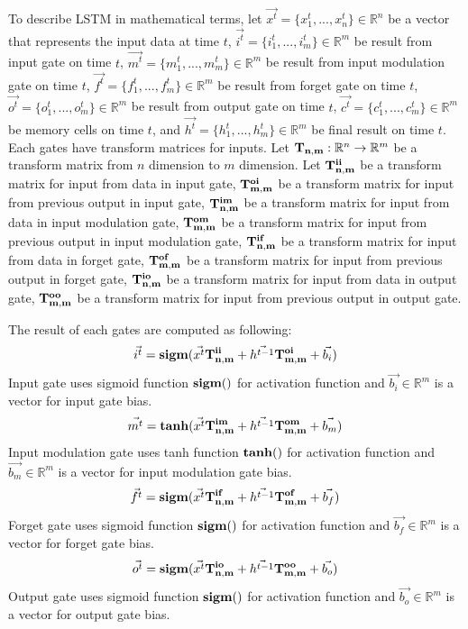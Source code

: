\documentclass[draft,dvipsnames]{drexel-thesis}
\begin{document}
\begin{thesis}
\begin{enumerate}
	To describe LSTM in mathematical terms, let $\vec{x^t} = \{ x_1^t, ..., x_n^t\} \in \mathbb{R}^n$ be a vector that represents the input data at time $t$, $\vec{i^t} = \{i_1^t, ..., i_m^t\} \in \mathbb{R}^m$ be result from input gate on time $t$, $\vec{m^t} = \{m_1^t, ..., m_m^t\} \in \mathbb{R}^m$ be result from input modulation gate on time $t$, $\vec{f^t} = \{f_1^t, ..., f_m^t\} \in \mathbb{R}^m$ be result from forget gate on time $t$, $\vec{o^t} = \{o_1^t, ..., o_m^t\} \in \mathbb{R}^m$ be result from output gate on time $t$, $\vec{c^t} = \{c_1^t, ..., c_m^t\} \in \mathbb{R}^m$ be memory cells on time $t$, and $\vec{h^t} = \{h_1^t, ..., h_m^t\} \in \mathbb{R}^m$ be final result on time $t$.
Each gates have transform matrices for inputs. Let $\bold{T_{n,m}}: \mathbb{R}^n \rightarrow \mathbb{R}^m$ be a transform matrix from $n$ dimension to $m$ dimension. Let $\bold{T_{n,m}^{ii}}$ be a transform matrix for input from data in input gate, $\bold{T_{m,m}^{oi}}$ be a transform matrix for input from previous output in input gate, $\bold{T_{n,m}^{im}}$ be a transform matrix for input from data in input modulation gate, $\bold{T_{m,m}^{om}}$ be a transform matrix for input from previous output in input modulation gate, $\bold{T_{n,m}^{if}}$ be a transform matrix for input from data in forget gate, $\bold{T_{m,m}^{of}}$ be a transform matrix for input from previous output in forget gate, $\bold{T_{n,m}^{io}}$ be a transform matrix for input from data in output gate, $\bold{T_{m,m}^{oo}}$ be a transform matrix for input from previous output in output gate.

	The result of each gates are computed as following:
	$$\vec{i^t} = \bold{sigm}(\vec{x^t}\bold{T_{n,m}^{ii}} + \vec{h^{t-1}}\bold{T_{m,m}^{oi}} + \vec{b_i})$$
	Input gate uses sigmoid function $\bold{sigm()}$ for activation function and $\vec{b_i} \in \mathbb{R}^m$ is a vector for input gate bias.
	$$\vec{m^t} = \bold{tanh}(\vec{x^t}\bold{T_{n,m}^{im}} + \vec{h^{t-1}}\bold{T_{m,m}^{om}} + \vec{b_m})$$
	Input modulation gate uses tanh function $\bold{tanh()}$ for activation function and $\vec{b_m} \in \mathbb{R}^m$ is a vector for input modulation gate bias.
	$$\vec{f^t} = \bold{sigm}(\vec{x^t}\bold{T_{n,m}^{if}} + \vec{h^{t-1}}\bold{T_{m,m}^{of}} + \vec{b_f})$$
	Forget gate uses sigmoid function $\bold{sigm()}$ for activation function and $\vec{b_f} \in \mathbb{R}^m$ is a vector for forget gate bias.
	$$\vec{o^t} = \bold{sigm}(\vec{x^t}\bold{T_{n,m}^{io}} + \vec{h^{t-1}}\bold{T_{m,m}^{oo}} + \vec{b_o})$$
	Output gate uses sigmoid function $\bold{sigm()}$ for activation function and $\vec{b_o} \in \mathbb{R}^m$ is a vector for output gate bias.
		

\end{enumerate}
\end{thesis}
\end{document}

